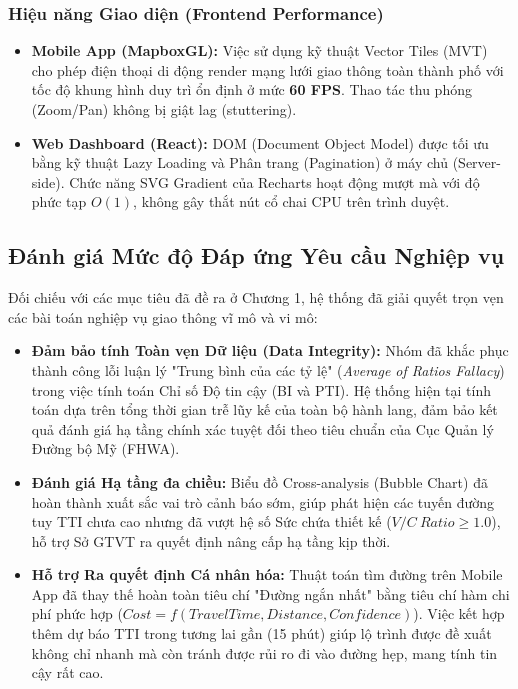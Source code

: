 \subsubsection{Hiệu năng Giao diện (Frontend Performance)}
\begin{itemize}
    \item \textbf{Mobile App (MapboxGL):} Việc sử dụng kỹ thuật Vector Tiles (MVT) cho phép điện thoại di động render mạng lưới giao thông toàn thành phố với tốc độ khung hình duy trì ổn định ở mức \textbf{60 FPS}. Thao tác thu phóng (Zoom/Pan) không bị giật lag (stuttering).
    \item \textbf{Web Dashboard (React):} DOM (Document Object Model) được tối ưu bằng kỹ thuật Lazy Loading và Phân trang (Pagination) ở máy chủ (Server-side). Chức năng SVG Gradient của Recharts hoạt động mượt mà với độ phức tạp $O(1)$, không gây thắt nút cổ chai CPU trên trình duyệt.
\end{itemize}

\subsection{Đánh giá Mức độ Đáp ứng Yêu cầu Nghiệp vụ}

Đối chiếu với các mục tiêu đã đề ra ở Chương 1, hệ thống đã giải quyết trọn vẹn các bài toán nghiệp vụ giao thông vĩ mô và vi mô:

\begin{itemize}
    \item \textbf{Đảm bảo tính Toàn vẹn Dữ liệu (Data Integrity):} Nhóm đã khắc phục thành công lỗi luận lý "Trung bình của các tỷ lệ" (\textit{Average of Ratios Fallacy}) trong việc tính toán Chỉ số Độ tin cậy (BI và PTI). Hệ thống hiện tại tính toán dựa trên tổng thời gian trễ lũy kế của toàn bộ hành lang, đảm bảo kết quả đánh giá hạ tầng chính xác tuyệt đối theo tiêu chuẩn của Cục Quản lý Đường bộ Mỹ (FHWA).
    \item \textbf{Đánh giá Hạ tầng đa chiều:} Biểu đồ Cross-analysis (Bubble Chart) đã hoàn thành xuất sắc vai trò cảnh báo sớm, giúp phát hiện các tuyến đường tuy TTI chưa cao nhưng đã vượt hệ số Sức chứa thiết kế ($V/C \ Ratio \ge 1.0$), hỗ trợ Sở GTVT ra quyết định nâng cấp hạ tầng kịp thời.
    \item \textbf{Hỗ trợ Ra quyết định Cá nhân hóa:} Thuật toán tìm đường trên Mobile App đã thay thế hoàn toàn tiêu chí "Đường ngắn nhất" bằng tiêu chí hàm chi phí phức hợp ($Cost = f(TravelTime, Distance, Confidence)$). Việc kết hợp thêm dự báo TTI trong tương lai gần (15 phút) giúp lộ trình được đề xuất không chỉ nhanh mà còn tránh được rủi ro đi vào đường hẹp, mang tính tin cậy rất cao.
\end{itemize}

